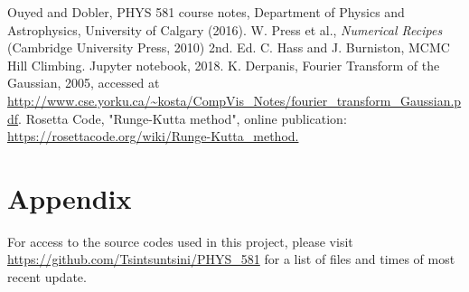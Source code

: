 \documentclass[twocolumn]{article}
\begin{document}
\begin{thebibliography}{00}
	Ouyed and Dobler, PHYS 581 course notes, Department of Physics and Astrophysics, University of Calgary (2016).
	W. Press et al., \emph{Numerical Recipes} (Cambridge University Press, 2010) 2nd. Ed.
	C. Hass and J. Burniston, MCMC Hill Climbing. Jupyter notebook, 2018.
	K. Derpanis, Fourier Transform of the Gaussian, 2005, accessed at \url{http://www.cse.yorku.ca/~kosta/CompVis_Notes/fourier_transform_Gaussian.pdf}.
	Rosetta Code, "Runge-Kutta method", online publication: \url{https://rosettacode.org/wiki/Runge-Kutta_method.}
\end{thebibliography}

\section{Appendix}
For access to the source codes used in this project, please visit \url{https://github.com/Tsintsuntsini/PHYS_581} for a list of files and times of most recent update.
	
\end{document}
